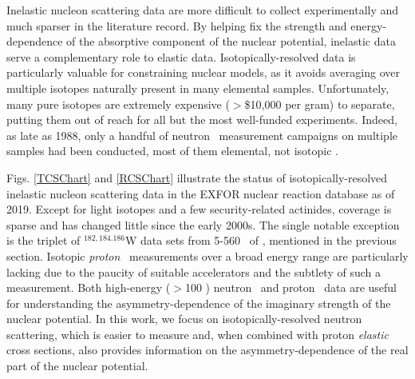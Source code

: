 Inelastic nucleon scattering data are more difficult to collect experimentally and much sparser in
the literature record. By helping fix the strength and energy-dependence of the absorptive component
of the nuclear potential, inelastic data serve a complementary role to elastic
data.
\noindent
Isotopically-resolved data is particularly valuable for constraining nuclear
models, as it avoids averaging over multiple isotopes naturally present in many elemental samples.
Unfortunately, many pure isotopes are extremely expensive ($>$\$10,000 per gram) to
separate, putting them out of reach for all but the most well-funded experiments.
Indeed, as late as 1988, only a handful of neutron \tot\ measurement campaigns
on multiple samples had been conducted, most of them elemental, not isotopic
\cite{BarnBook1988}.

Figs. \ref{TCSChart} and \ref{RCSChart} illustrate the status of isotopically-resolved inelastic
nucleon scattering data in the EXFOR nuclear reaction database as of 2019.
Except for light isotopes and a few security-related actinides, coverage is
sparse and has changed little since the early 2000s. The single notable
exception is the triplet of $^{182,184.186}$W data sets from 5-560 \mega\electronvolt\ of \cite{Dietrich2003}, 
mentioned in the previous section. Isotopic \textit{proton} \rxn\ measurements over
a broad energy range are particularly lacking due to the paucity of suitable
accelerators and the subtlety of such a measurement. 
Both high-energy ($>$100 \mega\electronvolt) neutron \tot\ and proton \rxn\ data are useful for
understanding the asymmetry-dependence of the imaginary strength of the nuclear potential.
In this work, we focus on isotopically-resolved neutron scattering, which
is easier to measure and, when combined with proton \textit{elastic} cross sections,
also provides information on the asymmetry-dependence of the real part of the nuclear potential.

